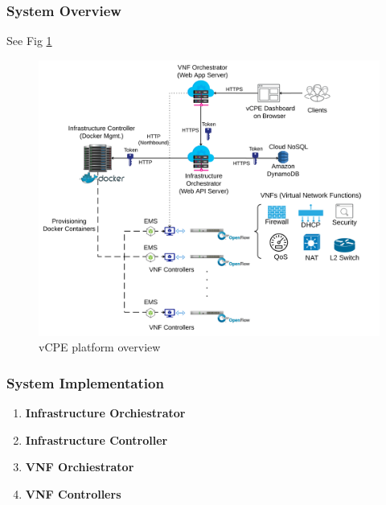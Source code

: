 \subsubsection{System Overview}
See Fig \ref{fig:vcpe_overview}
\begin{figure}[!t]
  \centering
  \includegraphics[width=\linewidth]{./figures/system-overview}
  \caption{vCPE platform overview}
  \label{fig:vcpe_overview}
\end{figure}

\subsubsection{System Implementation}
\begin{enumerate}[1)]
  \item{\bf{Infrastructure Orchiestrator}}
  \item{\bf{Infrastructure Controller}}
  \item{\bf{VNF Orchiestrator}}
  \item{\bf{VNF Controllers}}
\end{enumerate}
